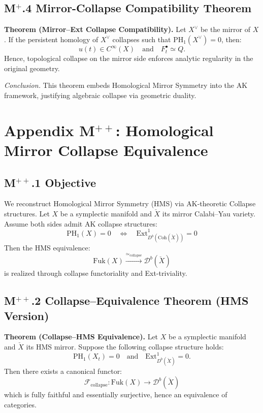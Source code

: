 \documentclass[11pt]{article}
\begin{document}
\begin{axiom}
\begin{axiom}
{{\subsection*{M$^+$.4 Mirror-Collapse Compatibility Theorem}
\textbf{Theorem (Mirror–Ext Collapse Compatibility).}  
Let \( X^\vee \) be the mirror of \( X \). If the persistent homology of \( X^\vee \) collapses such that \( \mathrm{PH}_1(X^\vee) = 0 \), then:
\[
u(t) \in C^\infty(X) \quad \text{and} \quad F^\bullet_t \simeq Q.
\]
Hence, topological collapse on the mirror side enforces analytic regularity in the original geometry.

\textit{Conclusion.} This theorem embeds Homological Mirror Symmetry into the AK framework, justifying algebraic collapse via geometric duality.


\section*{Appendix M$^{++}$: Homological Mirror Collapse Equivalence}

\subsection*{M$^{++}$.1 Objective}

We reconstruct Homological Mirror Symmetry (HMS) via AK-theoretic Collapse structures.  
Let \( X \) be a symplectic manifold and \( \check{X} \) its mirror Calabi–Yau variety.  
Assume both sides admit AK collapse structures:
\[
\mathrm{PH}_1(X) = 0 \quad \Leftrightarrow \quad \mathrm{Ext}^1_{D^b(\mathrm{Coh}(\check{X}))} = 0
\]
Then the HMS equivalence:
\[
\mathrm{Fuk}(X) \xrightarrow{\simeq_{\text{collapse}}} \mathcal{D}^b(\check{X})
\]
is realized through collapse functoriality and Ext-triviality.

\subsection*{M$^{++}$.2 Collapse–Equivalence Theorem (HMS Version)}

\textbf{Theorem (Collapse–HMS Equivalence).}  
Let \( X \) be a symplectic manifold and \( \check{X} \) its HMS mirror.  
Suppose the following collapse structure holds:
\[
\mathrm{PH}_1(X_t) = 0 \quad \text{and} \quad \mathrm{Ext}^1_{D^b(\check{X})} = 0.
\]
Then there exists a canonical functor:
\[
\mathcal{F}_{\mathrm{collapse}} : \mathrm{Fuk}(X) \to \mathcal{D}^b(\check{X})
\]
which is fully faithful and essentially surjective, hence an equivalence of categories.

}}
\end{axiom}
\end{axiom}
\end{document}
